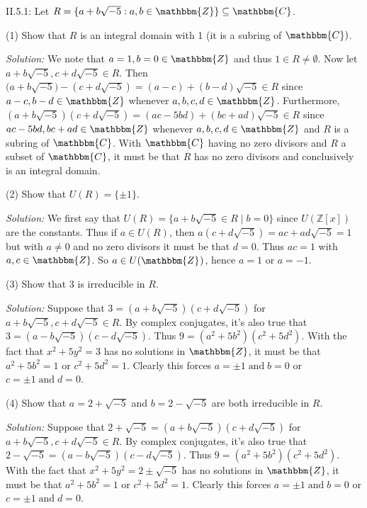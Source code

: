 \documentclass{letter}
\newcommand{\tmem}[1]{{\em #1\/}}
\newcommand{\tmop}[1]{\ensuremath{\operatorname{#1}}}
\begin{document}
II.5.1: Let $R =\{a + b \sqrt{- 5} : a, b \in \mathbbm{Z}\} \subseteq
\mathbbm{C}$.

(1) Show that $R$ is an integral domain with 1 (it is a subring of
$\mathbbm{C})$.

{\tmem{Solution:}} We note that $a = 1, b = 0 \in \mathbbm{Z}$ and thus $1 \in
R \neq \emptyset$. Now let $a + b \sqrt{- 5}, c + d \sqrt{- 5} \in R$. Then
$\text{($a + b \sqrt{- 5}) - (c + d \sqrt{- 5})$} = (a - c) + (b - d) \sqrt{-
5} \in R$ since $a - c, b - d \in \mathbbm{Z}$ whenever $a, b, c, d \in
\mathbbm{Z}$. Furthermore, $(a + b \sqrt{- 5}) (c + d \sqrt{- 5}) = (a c - 5 b
d) + (b c + a d) \sqrt{- 5} \in R$ since $a c - 5 b d, b c + a d \in
\mathbbm{Z}$ whenever $a, b, c, d \in \mathbbm{Z}$ and $R$ is a subring of
$\mathbbm{C}$. With $\mathbbm{C}$ having no zero divisors and $R$ a subset of
$\mathbbm{C}$, it must be that $R$ has no zero divisors and conclusively is an
integral domain.

(2) Show that $U (R) =\{\pm 1\}$.

{\tmem{Solution:}} We first say that $U(R) = \{ a + b\sqrt{-5} \in R \mid b = 0\}$ since 
$U(\mathbb{Z}[x])$ are the constants. Thus if $a \in U (R)$, 
then $a (c + d\sqrt{- 5}) = a c + a d \sqrt{- 5} = 1$ 
but with $a \neq 0$ and no zero divisors it must be that $d = 0$. 
Thus $a c = 1$ with $a, c \in \mathbbm{Z}$. So $a \in U (\mathbbm{Z}_{})$, 
hence $a = 1$ or $a = - 1$. \

(3) Show that 3 is irreducible in $R$.

{\tmem{Solution:}} Suppose that $3 = (a + b \sqrt{- 5}) (c + d \sqrt{- 5})$
for $a + b \sqrt{- 5}, c + d \sqrt{- 5} \in R$. By complex conjugates, it's
also true that $3 = (a - b \sqrt{- 5}) (c - d \sqrt{- 5})$. Thus $9 = (a^2 + 5
b^2) (c^2 + 5 d^2)$. With the fact that $x^2 + 5 y^2 = 3$ has no solutions in
$\mathbbm{Z}$, it must be that $a^2 + 5 b^2 = 1$ or $c^2 + 5 d^2 = 1$. Clearly
this forces $a = \pm 1 \tmop{and} b = 0$ or $c = \pm 1 \tmop{and} d = 0$.

(4) Show that $a = 2 + \sqrt{- 5}$ and $b = 2 - \sqrt{- 5}$ are both
irreducible in $R$.

{\tmem{Solution:}} Suppose that $2 + \sqrt{- 5} = (a + b \sqrt{- 5}) (c + d
\sqrt{- 5})$ for $a + b \sqrt{- 5}, c + d \sqrt{- 5} \in R$. By complex
conjugates, it's also true that $2 - \sqrt{- 5} = (a - b \sqrt{- 5}) (c - d
\sqrt{- 5})$. Thus $9 = (a^2 + 5 b^2) (c^2 + 5 d^2)$. With the fact that $x^2
+ 5 y^2 = 2 \pm \sqrt{- 5}$ has no solutions in $\mathbbm{Z}$, it must be that
$a^2 + 5 b^2 = 1$ or $c^2 + 5 d^2 = 1$. Clearly this forces $a = \pm 1
\tmop{and} b = 0$ or $c = \pm 1 \tmop{and} d = 0$.
\end{document}
